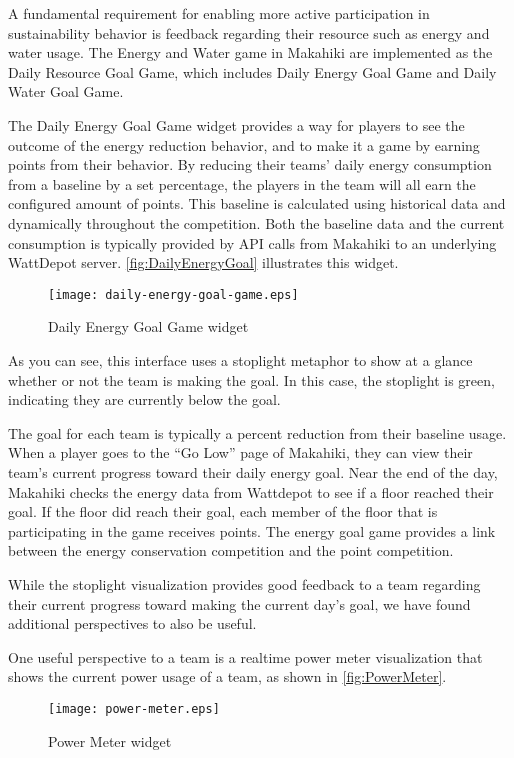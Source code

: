 A fundamental requirement for enabling more active participation in sustainability behavior is feedback regarding their resource such as energy and water usage. The Energy and Water game in Makahiki are implemented as the Daily Resource Goal Game, which includes Daily Energy Goal Game and Daily Water Goal Game.

The Daily Energy Goal Game widget provides a way for players to see the outcome of the energy reduction behavior, and to make it a game by earning points from their behavior. By reducing their teams' daily energy consumption from a baseline by a set percentage, the players in the team will all earn the configured amount of points. This baseline is calculated using historical data and dynamically throughout the competition. Both the baseline data and the current consumption is typically provided by API calls from Makahiki to an underlying WattDepot server.
\autoref{fig:DailyEnergyGoal} illustrates this widget.

\begin{figure}[!ht]
  \center
  \texttt{[image: daily-energy-goal-game.eps]}
  \caption{Daily Energy Goal Game widget}
  \label{fig:DailyEnergyGoal}
\end{figure}

As you can see, this interface uses a stoplight metaphor to show at a glance whether or not the team is making the goal. In this case, the stoplight is green, indicating they are currently below the goal.

The goal for each team is typically a percent reduction from their baseline usage. When a player goes to the ``Go Low'' page of Makahiki, they can view their team's current progress toward their daily energy goal. Near the end of the day, Makahiki checks the energy data from Wattdepot to see if a floor reached their goal. If the floor did reach their goal, each member of the floor that is participating in the game receives points. The energy goal game provides a link between the energy conservation competition and the point competition.

While the stoplight visualization provides good feedback to a team regarding their current progress toward making the current day's goal, we have found additional perspectives to also be useful.

One useful perspective to a team is a realtime power meter visualization that shows the current power usage of a team, as shown in \autoref{fig:PowerMeter}.

\begin{figure}[!ht]
  \center
  \texttt{[image: power-meter.eps]}
  \caption{Power Meter widget}
  \label{fig:PowerMeter}
\end{figure}

